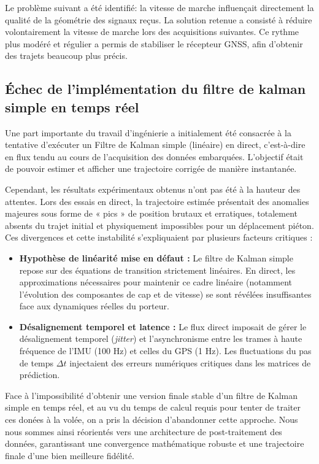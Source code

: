 Le problème suivant a été identifié: la vitesse de marche influençait directement la qualité de la géométrie des signaux reçus. La solution retenue a consisté à réduire volontairement la vitesse de marche lors des acquisitions suivantes. Ce rythme plus modéré et régulier a permis de stabiliser le récepteur GNSS, afin d'obtenir des trajets beaucoup plus précis.

\subsection{Échec de l'implémentation du filtre de kalman simple en temps réel}
Une part importante du travail d'ingénierie a initialement été consacrée à la tentative d'exécuter un Filtre de Kalman simple (linéaire) en direct, c'est-à-dire en flux tendu au cours de l'acquisition des données embarquées. L'objectif était de pouvoir estimer et afficher une trajectoire corrigée de manière instantanée.

Cependant, les résultats expérimentaux obtenus n'ont pas été à la hauteur des attentes. Lors des essais en direct, la trajectoire estimée présentait des anomalies majeures sous forme de « pics » de position brutaux et erratiques, totalement absents du trajet initial et physiquement impossibles pour un déplacement piéton. Ces divergences et cette instabilité s'expliquaient par plusieurs facteurs critiques :

\begin{itemize}
    \item \textbf{Hypothèse de linéarité mise en défaut :} Le filtre de Kalman simple repose sur des équations de transition strictement linéaires. En direct, les approximations nécessaires pour maintenir ce cadre linéaire (notamment l'évolution des composantes de cap et de vitesse) se sont révélées insuffisantes face aux dynamiques réelles du porteur.
    \item \textbf{Désalignement temporel et latence :} Le flux direct imposait de gérer le désalignement temporel (\textit{jitter}) et l'asynchronisme entre les trames à haute fréquence de l'IMU (100 Hz) et celles du GPS (1 Hz). Les fluctuations du pas de temps $\Delta t$ injectaient des erreurs numériques critiques dans les matrices de prédiction.
\end{itemize}

Face à l'impossibilité d'obtenir une version finale stable d'un filtre de Kalman simple en temps réel, et au vu du temps de calcul requis pour tenter de traiter ces donées à la volée, on a pris la décision d'abandonner cette approche. Nous nous sommes ainsi réorientés vers une architecture de post-traitement des données, garantissant une convergence mathématique robuste et une trajectoire finale d'une bien meilleure fidélité.